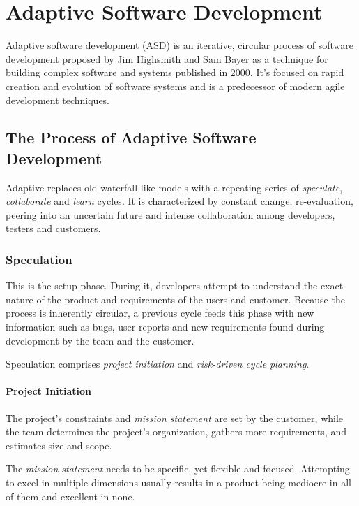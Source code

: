 \documentclass[main.tex]{subfiles}
\begin{document}
\section{Adaptive Software Development}

Adaptive software development (ASD) is an iterative, circular process of software development proposed by Jim Highsmith and Sam Bayer as a technique for building complex software and systems published in 2000.
It's focused on rapid creation and evolution of software systems and is a predecessor of modern agile development techniques.

\subsection{The Process of Adaptive Software Development}

Adaptive replaces old waterfall-like models with a repeating series of \emph{speculate}, \emph{collaborate} and \emph{learn} cycles.
It is characterized by constant change, re-evaluation, peering into an uncertain future and intense collaboration among developers, testers and customers.

\subsubsection{Speculation}

This is the setup phase. During it, developers attempt to understand the exact nature of the product and requirements of the users and customer.
Because the process is inherently circular, a previous cycle feeds this phase with new information such as bugs, user reports and new requirements found during development by the team and the customer.

Speculation comprises \emph{project initiation} and \emph{risk-driven cycle planning}.

\paragraph{Project Initiation} The project's constraints and \textit{mission statement} are set by the customer, while the team determines the project's organization, gathers more requirements, and estimates size and scope.

The \emph{mission statement} needs to be specific, yet flexible and focused. Attempting to excel in multiple dimensions usually results in a product being mediocre in all of them and excellent in none.
\end{document}
